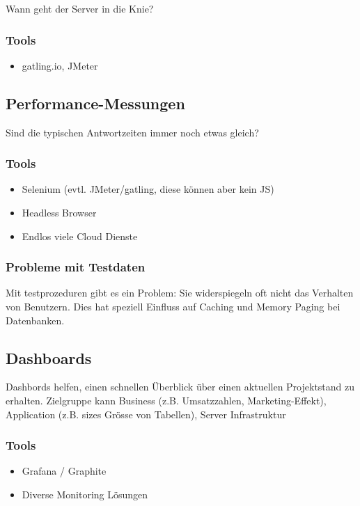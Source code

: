 Wann geht der Server in die Knie?

\subsubsection{Tools}
\begin{itemize}
	\item gatling.io, JMeter
\end{itemize}


\subsection{Performance-Messungen}

Sind die typischen Antwortzeiten immer noch etwas gleich?

\subsubsection{Tools}

\begin{itemize}
	\item Selenium (evtl. JMeter/gatling, diese können aber kein JS)
	\item Headless Browser
	\item Endlos viele Cloud Dienste
\end{itemize}

\subsubsection{Probleme mit Testdaten}

Mit testprozeduren gibt es ein Problem: Sie widerspiegeln oft nicht das Verhalten von Benutzern. Dies hat speziell Einfluss auf Caching und Memory Paging bei Datenbanken.

\subsection{Dashboards}

Dashbords helfen, einen schnellen Überblick über einen aktuellen Projektstand zu erhalten. Zielgruppe kann Business (z.B. Umsatzzahlen, Marketing-Effekt), Application (z.B. sizes Grösse von Tabellen), Server Infrastruktur

\subsubsection{Tools}

\begin{itemize}
	\item Grafana / Graphite
	\item Diverse Monitoring Lösungen
\end{itemize}


